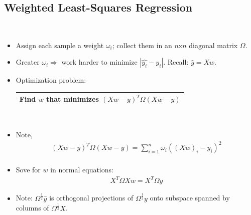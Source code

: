 \documentclass[10pt]{article}
\begin{document}
	\subsection*{Weighted Least-Squares Regression}
	\
	\begin{itemize}
		\item Assign each sample a weight $\omega_{i}$; collect them in an $n$x$n$ diagonal matrix $\Omega$.
		\item Greater $\omega_{i} \Rightarrow$ work harder to minimize $|\hat{y_{i}} - y_{i}|$. Recall: $\hat{y} = Xw$.
		\item Optimization problem:
			\begin{center}
				\begin{tabular}{|c|}
					\hline
					Find $w$ that minimizes $(Xw - y)^{T} \Omega (Xw-y)$\\
					\hline
				\end{tabular}\\
			\end{center}
		\item Note,
			\begin{align*}
				(Xw - y)^{T}\Omega (Xw-y) = \sum_{i=1}^{n} \omega_{i}((Xw)_{i} - y_{i})^{2}\\
			\end{align*}
		\item Sove for $w$ in normal equations:	
			\begin{align*}
				X^{T}\Omega Xw = X^{T}\Omega y
			\end{align*}
		\item Note: $\Omega^{\frac{1}{2}}\hat{y}$ is orthogonal projections of $\Omega^{\frac{1}{2}}y$ onto subspace spanned by columns of $\Omega^{\frac{1}{2}}X$.
	\end{itemize}
	
\end{document}

